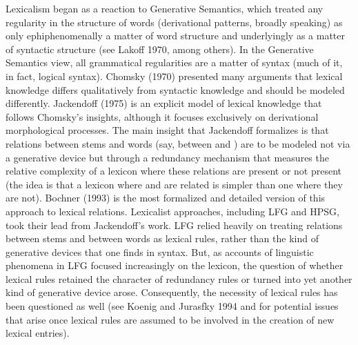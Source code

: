 \documentclass[output=paper]{langsci/langscibook}
\begin{document}
Lexicalism began as a reaction to Generative Semantics, which treated any regularity in the structure of words (derivational patterns, broadly speaking) as only ephiphenomenally a matter of word structure and underlyingly as a matter of syntactic structure (see Lakoff 1970, among others). In the Generative Semantics view, all grammatical regularities are a matter of syntax (much of it, in fact, logical syntax). Chomsky (1970) presented many arguments that lexical knowledge differs qualitatively from syntactic knowledge and should be modeled differently. Jackendoff (1975) is an explicit model of lexical knowledge that follows Chomsky's insights, although it focuses exclusively on derivational morphological processes. The main insight that Jackendoff formalizes is that relations between stems and words (say, between  and ) are to be modeled not via a generative device but through a redundancy mechanism that measures the relative complexity of a lexicon where these relations are present or not present (the idea is that a lexicon where  and  are related is simpler than one where they are not).
Bochner (1993) is the most formalized and detailed version of this approach to lexical relations. Lexicalist approaches, including LFG and HPSG, took their lead from Jackendoff's work.  LFG relied heavily on treating relations between stems and between words as lexical rules, rather than the kind of generative devices that one finds in syntax. But, as accounts of linguistic phenomena in LFG focused increasingly on the lexicon, the question of whether lexical rules retained the character of redundancy rules or turned into yet another kind of generative device arose.  Consequently, the necessity of lexical rules has been questioned as well (see Koenig and Jurasfky 1994 and \citet{Koenig99a} for potential issues that arise once lexical rules are assumed to be involved in the creation of new lexical entries). 
\end{document}
